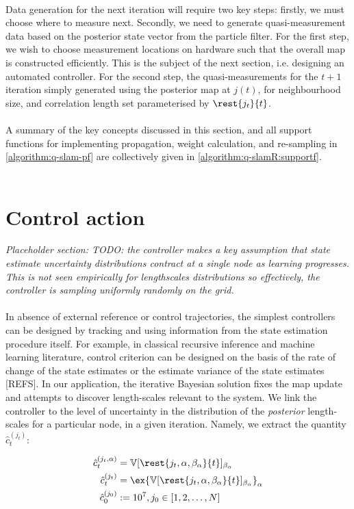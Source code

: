 \\
Data generation for the next iteration will require two key steps: firstly, we must choose where to measure next. Secondly, we need to generate quasi-measurement data based on the posterior state vector from the particle filter. For the first step, we wish to choose measurement locations on hardware such that the overall map  is constructed efficiently. This is the subject of the next section, i.e. designing an automated controller. For the second step, the quasi-measurements for the $t+1$ iteration simply generated using the posterior map at $j(t)$, for neighbourhood size, and correlation length set parameterised by $\rest{j_t}{t}$. \\
\\
A summary of the key concepts discussed in this section, and all support functions for implementing propagation, weight calculation, and re-sampling  in \cref{algorithm:q-slam-pf} are collectively given in \cref{algorithm:q-slamR:supportf}. \\
\\


\section{Control action} \label{sec:control}

\textit{Placeholder section: TODO: the controller makes a key assumption that state estimate uncertainty distributions contract at a single node as learning progresses. This is not seen empirically for lengthscales distributions so effectively, the controller is sampling uniformly randomly on the grid. } \\
\\
In absence of external reference or control trajectories, the simplest controllers can be designed by tracking and using information from the state estimation procedure itself. For example, in classical recursive inference and machine learning literature, control criterion can be designed on the basis of the rate of change of the state estimates or the estimate variance of the state estimates [REFS]. In our application, the iterative Bayesian solution fixes the map update and attempts to discover length-scales relevant to the system. We link the controller to the level of uncertainty in the distribution of the \textit{posterior} length-scales for a particular node, in a given iteration. Namely, we extract the quantity $\hat{c}_t^{(j_t)}$:

\begin{align}
 \hat{c}_t^{(j_t, \alpha)} & = \mathbb{V}[\rest{j_t, \alpha, \beta_\alpha}{t}]_{\beta_\alpha}	\label{eqn:slam:controller} \\
  \hat{c}_t^{(j_t)} & = \ex{\mathbb{V}[\rest{j_t, \alpha, \beta_\alpha}{t}]_{\beta_\alpha}}_\alpha	\label{eqn:slam:controller2} \\
  \hat{c}_0^{(j_0)} & := 10^7, j_0 \in [1, 2, \hdots, N]
\end{align}

